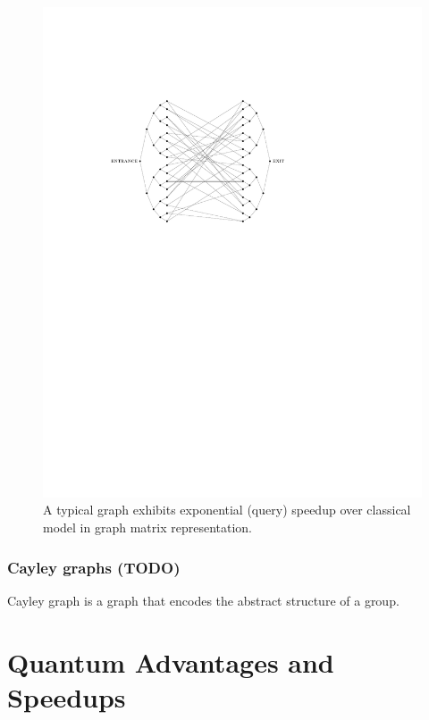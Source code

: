 \begin{figure}[!ht]
	\centering
	\includegraphics[width=.5\linewidth]{glued_tree.pdf}
	\caption{A typical graph exhibits exponential (query) speedup over classical model in graph matrix representation. \cite{childsExponentialAlgorithmicSpeedup2003}}
	\label{fig:glued_tree}
\end{figure}

\subsubsection{Cayley graphs (TODO)}
\begin{definition}\label{def:cayley_graph}
	Cayley graph is a graph that encodes the abstract structure of a group. 
\end{definition}

\section{Quantum Advantages and Speedups}\label{sec:speedup}

